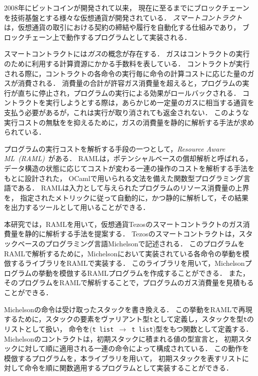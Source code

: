 \documentclass{kuisthesis}
\date{2021年2月2日}
\begin{document}
\maketitle

\begin{jabstract}
2008年にビットコインが開発されて以来，
現在に至るまでにブロックチェーンを技術基盤とする様々な仮想通貨が開発されている．
\emph{スマートコントラクト}は，仮想通貨の取引における契約の締結や履行を自動化する仕組みであり，
ブロックチェーン上で動作するプログラムとして実装される．

スマートコントラクトには\emph{ガス}の概念が存在する．
ガスはコントラクトの実行のために利用する計算資源にかかる手数料を表している．
コントラクトが実行される際に，コントラクトの各命令の実行毎に命令の計算コストに応じた量のガスが消費される．
消費量の合計が許容ガス消費量を超えると，プログラムの実行が直ちに停止され，プログラムの実行による効果がロールバックされる．
コントラクトを実行しようとする際は，あらかじめ一定量のガスに相当する通貨を支払う必要があるが，これは実行が取り消されても返金されない．
このような実行コストの無駄をを抑えるために，ガスの消費量を静的に解析する手法が求められている．

プログラムの実行コストを解析する手段の一つとして，\emph{Resource Aware ML\ (RAML)}\ がある．
RAMLは，ポテンシャルベースの償却解析と呼ばれる，データ構造の状態に応じてコストが変わる一連の操作のコストを解析する手法をもとに設計された，
OCamlで用いられる文法を備えた関数型プログラミング言語である．
RAMLは入力として与えられたプログラムのリソース消費量の上界を，
指定されたメトリックに従って自動的に，かつ静的に解析して，その結果を出力するツールとして用いることができる．

本研究では，RAMLを用いて，仮想通貨Tezosのスマートコントラクトのガス消費量を静的に解析する手法を提案する．
Tezosのスマートコントラクトは，スタックベースのプログラミング言語Michelsonで記述される．
このプログラムをRAMLで解析するために，Michelsonにおいて実装されている各命令の挙動を模倣するライブラリをRAMLで実装する．
このライブラリを用いて，Michelsonプログラムの挙動を模倣するRAMLプログラムを作成することができる．
また，そのプログラムをRAMLで解析することで，プログラムのガス消費量を見積もることができる．

Michelsonの命令は受け取ったスタックを書き換える．
この挙動をRAMLで再現するために，スタックの要素をヴァリアント型{\tt t}として定義し，スタックを型{\tt t}のリストとして扱い，
命令を({\tt t list $\rightarrow$ t list})型をもつ関数として定義する．
Michelsonのコントラクトは，初期スタックに積まれる値の型宣言と，
初期スタックに対して順に適用される一連の命令によって構成されている．
この動作を模倣するプログラムを，本ライブラリを用いて，
初期スタックを表すリストに対して命令を順に関数適用するプログラムとして実装することができる．


\end{jabstract}
\end{document}
